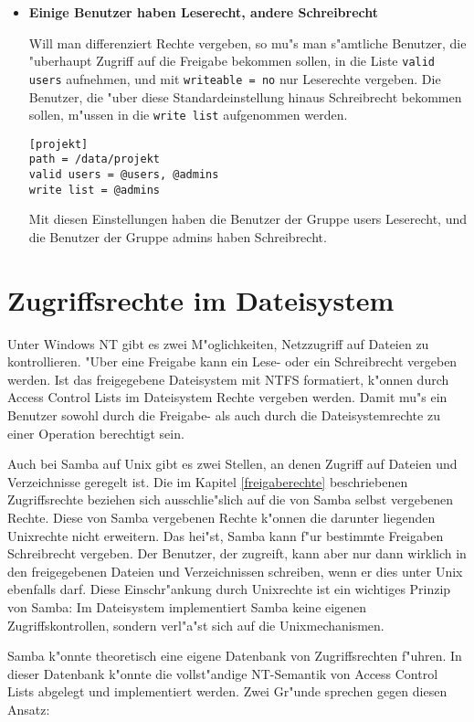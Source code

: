 \documentclass{scrartcl}\usepackage{pslatex}\typearea{12}
\newcommand{\param}{\texttt}
\begin{document}
\begin{itemize}
\item {\bf Einige Benutzer haben Leserecht, andere Schreibrecht}

Will man differenziert Rechte vergeben, so mu"s man s"amtliche
Benutzer, die "uberhaupt Zugriff auf die Freigabe bekommen sollen, in
die Liste \param{valid users} aufnehmen, und mit \param{writeable =
no} nur Leserechte vergeben. Die Benutzer, die "uber diese
Standardeinstellung hinaus Schreibrecht bekommen sollen, m"ussen in
die \param{write list} aufgenommen werden.

\begin{verbatim}
[projekt]
path = /data/projekt
valid users = @users, @admins
write list = @admins
\end{verbatim}

Mit diesen Einstellungen haben die Benutzer der Gruppe users
Leserecht, und die Benutzer der Gruppe admins haben Schreibrecht.

\end{itemize}

\section{Zugriffsrechte im Dateisystem}

Unter Windows NT gibt es zwei M"oglichkeiten, Netzzugriff auf Dateien
zu kontrollieren. "Uber eine Freigabe kann ein Lese- oder ein
Schreibrecht vergeben werden. Ist das freigegebene Dateisystem mit
NTFS formatiert, k"onnen durch Access Control Lists im Dateisystem
Rechte vergeben werden. Damit mu"s ein Benutzer sowohl durch die
Freigabe- als auch durch die Dateisystemrechte zu einer Operation
berechtigt sein.

Auch bei Samba auf Unix gibt es zwei Stellen, an denen Zugriff auf
Dateien und Verzeichnisse geregelt ist. Die im Kapitel
\ref{freigaberechte} beschriebenen Zugriffsrechte beziehen sich
ausschlie"slich auf die von Samba selbst vergebenen Rechte. Diese von
Samba vergebenen Rechte k"onnen die darunter liegenden Unixrechte
nicht erweitern. Das hei"st, Samba kann f"ur bestimmte Freigaben
Schreibrecht vergeben. Der Benutzer, der zugreift, kann aber nur dann
wirklich in den freigegebenen Dateien und Verzeichnissen schreiben,
wenn er dies unter Unix ebenfalls darf. Diese Einschr"ankung durch
Unixrechte ist ein wichtiges Prinzip von Samba: Im Dateisystem
implementiert Samba keine eigenen Zugriffskontrollen, sondern
verl"a"st sich auf die Unixmechanismen.

Samba k"onnte theoretisch eine eigene Datenbank von Zugriffsrechten
f"uhren. In dieser Datenbank k"onnte die vollst"andige NT-Semantik von
Access Control Lists abgelegt und implementiert werden. Zwei Gr"unde
sprechen gegen diesen Ansatz:
\end{document}
